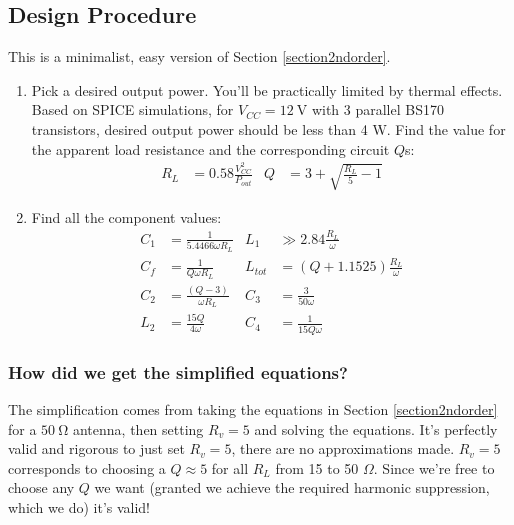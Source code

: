 \documentclass[10pt,letterpaper]{article}
\begin{document}
\subsection*{Design Procedure}
This is a minimalist, easy version of Section \ref{section2ndorder}.
\begin{enumerate}
\item Pick a desired output power. You'll be practically limited by thermal effects. Based on SPICE simulations, for $V_{CC}=\SI{12}{\volt}$ with 3 parallel BS170 transistors, desired output power should be less than 4 W. Find the value for the apparent load resistance and the corresponding circuit $Q$s:
\begin{align*}
R_L&=0.58\frac{V_{CC}^2}{P_{out}} &
Q&=3+\sqrt{\frac{R_L}{5}-1} 
\end{align*}
%


\item Find all the component values:
\begin{align*}
C_1&=\frac{1}{5.4466 \omega R_L} & L_1&\gg 2.84\frac{R_L}{\omega} \\
C_f&=\frac{1}{Q\omega R_L} &
L_{tot}&=(Q+1.1525)\frac{R_L}{\omega} \\
C_2&=\frac{(Q-3)}{\omega R_L} &
C_3&=\frac{3}{50\omega}\\
L_2&=\frac{15 Q }{4\omega} &
C_4 &= \frac{1}{15 Q \omega}
\end{align*}
\end{enumerate}
\subsubsection*{How did we get the simplified equations?}
The simplification comes from taking the equations in Section \ref{section2ndorder} for a $\SI{50}{\ohm}$ antenna, then setting $R_v=5$ and solving the equations. It's perfectly valid and rigorous to just set $R_v=5$, there are no approximations made. $R_v=5$ corresponds to choosing a $Q\approx 5$ for all $R_L$ from 15 to 50 $\Omega$. Since we're free to choose any $Q$ we want (granted we achieve the required harmonic suppression, which we do) it's valid!
\end{document}
